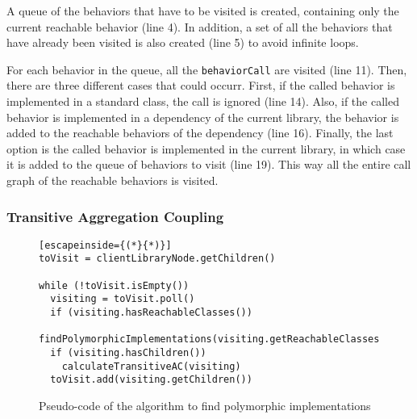 A queue of the behaviors that have to be visited is created, containing only the current reachable behavior (line 4). In addition, a set of all the behaviors that have already been visited is also created (line 5) to avoid infinite loops.

For each behavior in the queue, all the \texttt{behaviorCall} are visited (line 11). Then, there are three different cases that could occurr. First, if the called behavior is implemented in a standard class, the call is ignored (line 14). Also, if the called behavior is implemented in a dependency of the current library, the behavior is added to the reachable behaviors of the dependency (line 16). Finally, the last option is the called behavior is implemented in the current library, in which case it is added to the queue of behaviors to visit (line 19). This way all the entire call graph of the reachable behaviors is visited.

\subsubsection{Transitive Aggregation Coupling}

\begin{figure}[ht!]
\begin{lstlisting}[escapeinside={(*}{*)}]
toVisit = clientLibraryNode.getChildren()

while (!toVisit.isEmpty())
  visiting = toVisit.poll()
  if (visiting.hasReachableClasses())
    findPolymorphicImplementations(visiting.getReachableClasses())
  if (visiting.hasChildren())
    calculateTransitiveAC(visiting)
  toVisit.add(visiting.getChildren())
\end{lstlisting}
\caption{Pseudo-code of the algorithm to find polymorphic implementations}
\label{fig:tree-iterating-tac}
\end{figure}

